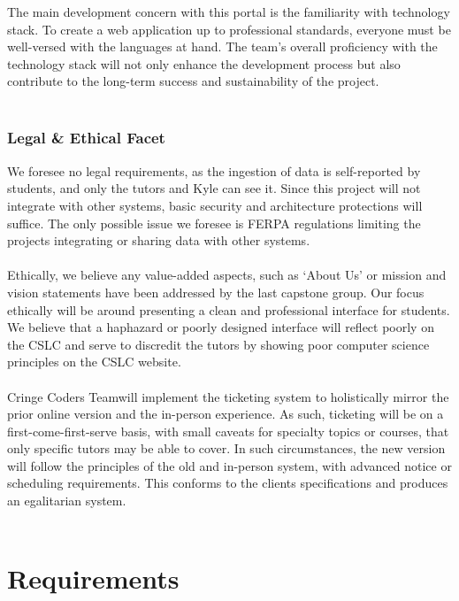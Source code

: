 \documentclass[oneside,openany,obeyspaces]{book}
\newcommand\tab[1][1cm]{\hspace*{#1}}
\newcommand\TeamName{Cringe Coders Team}
\begin{document}
\begin{flushleft}
    \tab The main development concern with this portal is the familiarity with technology stack. To create a web application up to professional standards, everyone must be well-versed with the languages at hand. The team’s overall proficiency with the technology stack will not only enhance the development process but also contribute to the long-term success and sustainability of the project.\\~\\

    \subsection{Legal \& Ethical Facet}

    \tab We foresee no legal requirements, as the ingestion of data is self-reported by students, and only the tutors and Kyle can see it. Since this project will not integrate with other systems, basic security and architecture protections will suffice. The only possible issue we foresee is FERPA regulations limiting the projects integrating or sharing data with other systems.\\~\\

    \tab Ethically, we believe any value-added aspects, such as ‘About Us’ or mission and vision statements have been addressed by the last capstone group. Our focus ethically will be around presenting a clean and professional interface for students. We believe that a haphazard or poorly designed interface will reflect poorly on the CSLC and serve to discredit the tutors by showing poor computer science principles on the CSLC website.\\~\\

    \tab \TeamName\space will implement the ticketing system to holistically mirror the prior online version and the in-person experience. As such, ticketing will be on a first-come-first-serve basis, with small caveats for specialty topics or courses, that only specific tutors may be able to cover. In such circumstances, the new version will follow the principles of the old and in-person system, with advanced notice or scheduling requirements. This conforms to the clients specifications and produces an egalitarian system.\\~\\



    \chapter{Requirements}


\end{flushleft}
\end{document}
